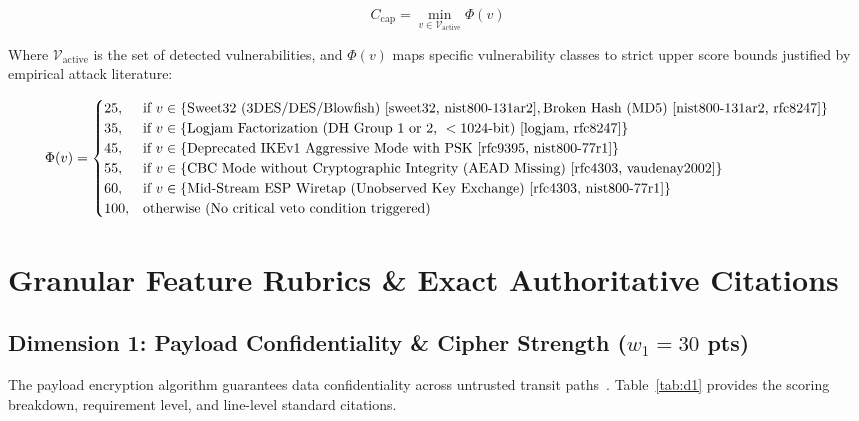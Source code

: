 \documentclass[11pt,a4paper]{article}
\begin{document}
\begin{equation}
C_{\text{cap}} = \min_{v \in \mathcal{V}_{\text{active}}} \Phi(v)
\end{equation}

Where $\mathcal{V}_{\text{active}}$ is the set of detected vulnerabilities, and $\Phi(v)$ maps specific vulnerability classes to strict upper score bounds justified by empirical attack literature:

\begin{equation}
\Phi(v) = 
\begin{cases}
25, & \text{if } v \in \{\text{Sweet32 (3DES/DES/Blowfish)}~\cite{sweet32, nist800-131ar2}, \text{Broken Hash (MD5)}~\cite{nist800-131ar2, rfc8247}\} \\
35, & \text{if } v \in \{\text{Logjam Factorization (DH Group 1 or 2, } <1024\text{-bit)}~\cite{logjam, rfc8247}\} \\
45, & \text{if } v \in \{\text{Deprecated IKEv1 Aggressive Mode with PSK}~\cite{rfc9395, nist800-77r1}\} \\
55, & \text{if } v \in \{\text{CBC Mode without Cryptographic Integrity (AEAD Missing)}~\cite{rfc4303, vaudenay2002}\} \\
60, & \text{if } v \in \{\text{Mid-Stream ESP Wiretap (Unobserved Key Exchange)}~\cite{rfc4303, nist800-77r1}\} \\
100, & \text{otherwise (No critical veto condition triggered)}
\end{cases}
\end{equation}

\section{Granular Feature Rubrics \& Exact Authoritative Citations}

\subsection{Dimension 1: Payload Confidentiality \& Cipher Strength ($w_1 = 30$ pts)}
The payload encryption algorithm guarantees data confidentiality across untrusted transit paths~\cite{rfc4303}. Table~\ref{tab:d1} provides the scoring breakdown, requirement level, and line-level standard citations.
\end{document}
